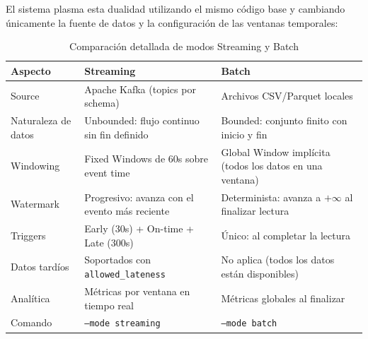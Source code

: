 \documentclass[12pt,a4paper]{article}
\begin{document}
El sistema plasma esta dualidad utilizando el mismo código base y cambiando únicamente la fuente de datos y la configuración de las ventanas temporales:

\begin{table}[H]
    \centering
    \caption{Comparación detallada de modos Streaming y Batch}
    \begin{tabular}{@{}lp{5cm}p{5cm}@{}}
        \toprule
        \textbf{Aspecto}    & \textbf{Streaming}                            & \textbf{Batch}                                           \\
        \midrule
        Source              & Apache Kafka (topics por schema)              & Archivos CSV/Parquet locales                             \\
        Naturaleza de datos & Unbounded: flujo continuo sin fin definido    & Bounded: conjunto finito con inicio y fin                \\
        Windowing           & Fixed Windows de 60s sobre event time         & Global Window implícita (todos los datos en una ventana) \\
        Watermark           & Progresivo: avanza con el evento más reciente & Determinista: avanza a $+\infty$ al finalizar lectura    \\
        Triggers            & Early (30s) + On-time + Late (300s)           & Único: al completar la lectura                           \\
        Datos tardíos       & Soportados con \texttt{allowed\_lateness}     & No aplica (todos los datos están disponibles)            \\
        Analítica           & Métricas por ventana en tiempo real           & Métricas globales al finalizar                           \\
        Comando             & \texttt{--mode streaming}                     & \texttt{--mode batch}                                    \\
        \bottomrule
    \end{tabular}
\end{table}
\end{document}
